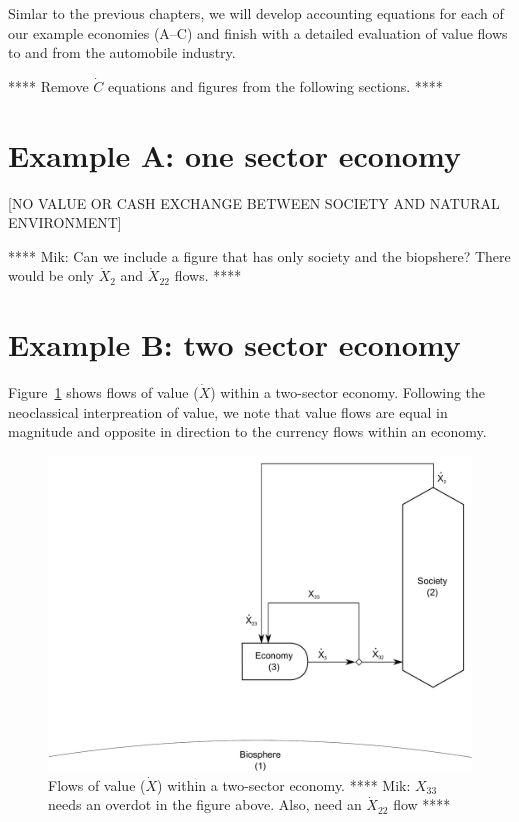 Simlar to the previous chapters, we will develop accounting equations
for each of our example economies (A--C) and finish 
with a detailed evaluation of value flows 
to and from the automobile industry.

**** Remove $\dot{C}$ equations and figures from the following sections. ****


\section{Example A: one sector economy}

[NO VALUE OR CASH EXCHANGE BETWEEN SOCIETY AND NATURAL ENVIRONMENT]

**** Mik: Can we include a figure that has only society and the biopshere? 
There would be only $\dot{X}_{2}$ and $\dot{X}_{22}$ flows. ****


\section{Example B: two sector economy}

Figure~\ref{fig:B_value} shows flows of value ($\dot{X}$) 
within a two-sector economy. 
Following the neoclassical interpreation of value, we note that
value flows are equal in magnitude and opposite in direction 
to the currency flows within an economy. 

\begin{figure}[h!]
\centering
\includegraphics[width=0.8\linewidth]{Part_3/Chapter_Values/images/2_sector_value.pdf}
\caption{Flows of value ($\dot{X}$) within a two-sector economy.
**** Mik: $X_{33}$ needs an overdot in the figure above. Also, need an $\dot{X}_{22}$ flow ****}
\label{fig:B_value}
\end{figure}

